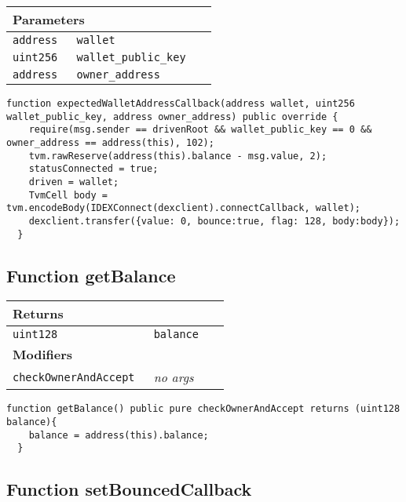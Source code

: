 \ifsoltables
\noindent\begin{tabular}{|l|l|p{5cm}|}\hline
\multicolumn{3}{|l|}{\bf Parameters}\\\hline
\tt address & \tt wallet &\\\hline
\tt uint256 & \tt wallet\_{}public\_{}key &\\\hline
\tt address & \tt owner\_{}address &\\\hline
\end{tabular}
\fi

\vspace{2cm}

\begin{lstlisting}[firstnumber=77]
  function expectedWalletAddressCallback(address wallet, uint256 wallet_public_key, address owner_address) public override {
    require(msg.sender == drivenRoot && wallet_public_key == 0 && owner_address == address(this), 102);
    tvm.rawReserve(address(this).balance - msg.value, 2);
    statusConnected = true;
    driven = wallet;
    TvmCell body = tvm.encodeBody(IDEXConnect(dexclient).connectCallback, wallet);
    dexclient.transfer({value: 0, bounce:true, flag: 128, body:body});
  }
\end{lstlisting}

\subsection{Function getBalance}


\ifsoltables
\noindent\begin{tabular}{|l|l|p{5cm}|}\hline
\multicolumn{3}{|l|}{\bf Returns}\\\hline
\tt uint128 & \tt balance &\\\hline
\multicolumn{3}{|l|}{\bf Modifiers}\\\hline
\tt checkOwnerAndAccept & {\em no args} &\\\hline
\end{tabular}
\fi

\vspace{2cm}

\begin{lstlisting}[firstnumber=124]
  function getBalance() public pure checkOwnerAndAccept returns (uint128 balance){
    balance = address(this).balance;
  }
\end{lstlisting}

\subsection{Function setBouncedCallback}

